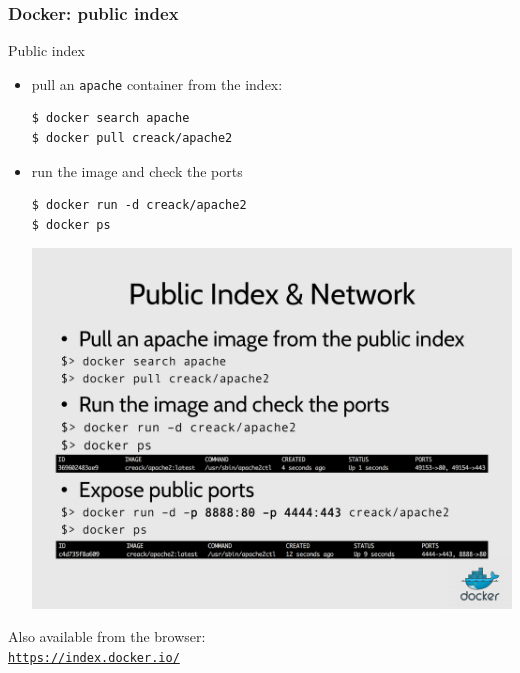 \documentclass[9pt]{beamer}
\newcommand{\myblue} [1] {{\color{blue}#1}}
\begin{document}
\begin{frame}[fragile]
  \frametitle{Docker: public index}
\begin{block}{}
  Public index
  \begin{itemize}
    \item pull an \texttt{apache} container from the index:
\begin{verbatim}
$ docker search apache
$ docker pull creack/apache2
\end{verbatim}

\item run the image and check the ports
\begin{verbatim}
$ docker run -d creack/apache2
$ docker ps
\end{verbatim}
\begin{center}
  \includegraphics[width=1.0\linewidth]{figs/docker-ps-apache.pdf}
\end{center}
  \end{itemize}
\end{block}

\begin{block}{}
Also available from the browser:\\
\myblue{\href{https://index.docker.io/}{\texttt{https://index.docker.io/}}}
\end{block}

\end{frame}
\end{document}
